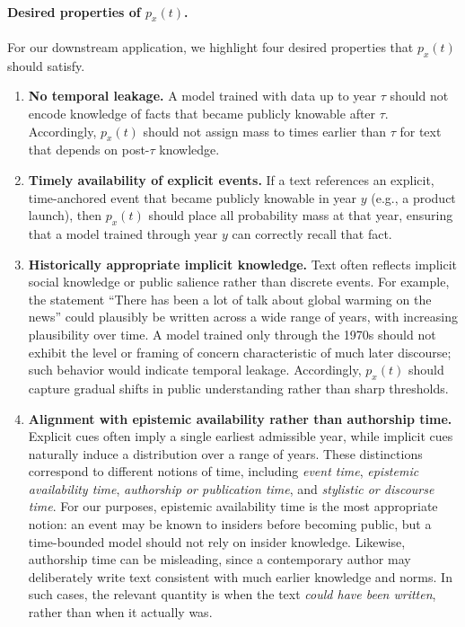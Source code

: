 \paragraph{Desired properties of $p_x(t)$.}
For our downstream application, we highlight four desired properties that $p_x(t)$ should satisfy.
\begin{enumerate}
    \item \textbf{No temporal leakage.}
    A model trained with data up to year $\tau$ should not encode knowledge of facts that became publicly knowable after $\tau$.
    Accordingly, $p_x(t)$ should not assign mass to times earlier than $\tau$ for text that depends on post-$\tau$ knowledge.

    \item \textbf{Timely availability of explicit events.}
    If a text references an explicit, time-anchored event that became publicly knowable in year $y$ (e.g., a product launch), then $p_x(t)$ should place all probability mass at that year, ensuring that a model trained through year $y$ can correctly recall that fact.

    \item \textbf{Historically appropriate implicit knowledge.}
    Text often reflects implicit social knowledge or public salience rather than discrete events.
    For example, the statement ``There has been a lot of talk about global warming on the news'' could plausibly be written across a wide range of years, with increasing plausibility over time.
    A model trained only through the 1970s should not exhibit the level or framing of concern characteristic of much later discourse; such behavior would indicate temporal leakage.
    Accordingly, $p_x(t)$ should capture gradual shifts in public understanding rather than sharp thresholds.

    \item \textbf{Alignment with epistemic availability rather than authorship time.}
    Explicit cues often imply a single earliest admissible year, while implicit cues naturally induce a distribution over a range of years.
    These distinctions correspond to different notions of time, including \emph{event time}, \emph{epistemic availability time}, \emph{authorship or publication time}, and \emph{stylistic or discourse time}.
    For our purposes, epistemic availability time is the most appropriate notion: an event may be known to insiders before becoming public, but a time-bounded model should not rely on insider knowledge.
    Likewise, authorship time can be misleading, since a contemporary author may deliberately write text consistent with much earlier knowledge and norms.
    In such cases, the relevant quantity is when the text \emph{could have been written}, rather than when it actually was.
\end{enumerate}

